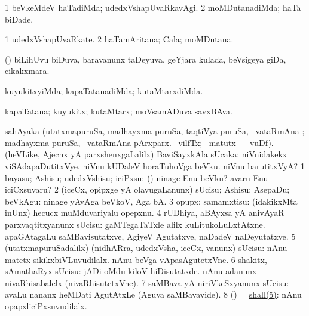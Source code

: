 \bentry
{}
\gl{\kirxvi}
\bmng
\bnum
\num{1} beVkeMdeV haTadiMda; udedxVshapUvaRkavAgi. 
\num{2} moMDutanadiMda; haTa biDade. 
\enum
\emng
\eentry

\bentry
{}
\gl{\nA}
\bmng
\bnum
\num{1} udedxVshapUvaRkate. 
\num{2} haTamAritana; Cala; moMDutana. 
\enum
\emng
\eentry

\bentry
{} 
\gl{\nA}
\expl{}
\bmng
(\AseTxrXV) biLihUvu biDuva, baravanunx taDeyuva, geYjara kulada, beVsigeya giDa, cikakxmara. 
\emng
\eentry

\bentry
{}
\gl{\kirxvi}
\bmng
kuyukitxyiMda; kapaTatanadiMda; kutaMtarxdiMda. 
\emng
\eentry

\bentry
{}
\gl{\nA}
\bmng
kapaTatana; kuyukitx; kutaMtarx; moVsamADuva savxBAva. 
\emng
\eentry

\bentry
sahAyaka
\gl{\kirx}
\bmng
(utatxmapuruSa, madhayxma puruSa, taqtiVya puruSa, \Eva\ vataRmAna ; madhayxma puruSa, \Eva\ vataRmAna pArxparx.  \ucAcx\ vilfTx; \BU\ matutx \BUkaq\  \ucAcx\ vuDf). (heVLike, Ajecnx yA parxshenxgaLalilx) BaviSayxkAla sUcaka:  niVnidakekx viSAdapaDutitxVye.  niVnu kUDaleV horaTuhoVga beVku.  niVnu barutitxVyA? 
\bnum
\num{1} bayasu; Ashisu; udedxVshisu; iciPxsu: (\pArxparx)  ninage Enu beVku?  avaru Enu iciCxsuvaru? 
\num{2} (iceCx, opipxge yA olavugaLanunx) sUcisu; Ashisu; AsepaDu; beVkAgu:  ninage yAvAga beVkoV, Aga bA. 
\num{3} opupx; samamxtisu:  (idakikxMta inUnx) hecucx muMduvariyalu opepxnu. 
\num{4} rUDhiya, aBAyxsa yA anivAyaR parxvaqtitxyanunx sUcisu:  gaMTegaTaTxle alilx kuLitukoLuLxtAtxne.  apaGAtagaLu saMBavisutatxve, AgiyeV Agutatxve, naDadeV naDeyutatxve. 
\num{5} (utatxmapuruSadalilx) (nidhARra, udedxVsha, iceCx, \mo vanunx) sUcisu:  nAnu matetx sikikxbiVLuvudilalx.  nAnu beVga vApasAgutetxVne. 
\num{6} shakitx, sAmathaRyx sUcisu:  jADi oMdu kiloV hiDisutatxde.  nAnu adanunx nivaRhisabalelx (nivaRhisutetxVne). 
\num{7} saMBava yA niriVkeSxyanunx sUcisu:  avaLu nananx heMDati AgutAtxLe (Aguva saMBavavide). 
\num{8} (\AmA) = \hyperref{kandict_s.pdf}{S}{shall(5)}{shall(5)}:  nAnu opapxliciPxsuvudilalx. 
\enum
\emng

